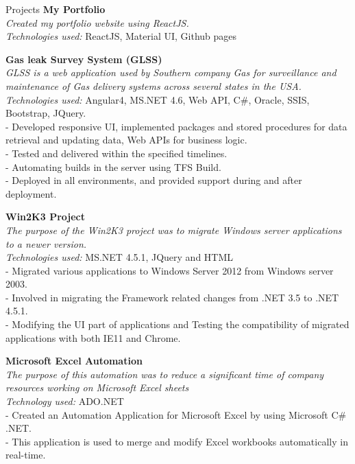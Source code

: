 \documentclass{resume} %
\begin{document}
\begin{rSection}{Projects}
{\bf My Portfolio}
\\{\textit{ Created my portfolio website using ReactJS.}}
\\{\textit{Technologies used:}} ReactJS, Material UI, Github pages

{\bf Gas leak Survey System (GLSS)}
\\{\textit{ GLSS is a web application used by Southern company Gas for surveillance and maintenance of Gas delivery systems across several states in the USA.}}
\\{\textit{Technologies used:}} Angular4, MS.NET 4.6, Web API, C\#, Oracle, SSIS, Bootstrap, JQuery.
\\- Developed responsive UI, implemented packages and stored procedures for data retrieval and updating data, Web APIs for business logic. 
\\- Tested and delivered within the specified timelines.
\\- Automating builds in the server using TFS Build.
\\- Deployed in all environments, and provided support during and after deployment. 

{\bf Win2K3 Project}
\\{\textit{The purpose of the Win2K3 project was to migrate Windows server applications to a newer version.}}
\\{\textit{Technologies used:}} MS.NET 4.5.1, JQuery and HTML
\\- Migrated various applications to Windows Server 2012 from Windows server 2003.
\\- Involved in migrating the Framework related changes from .NET 3.5 to .NET 4.5.1.
\\- Modifying the UI part of applications and Testing the compatibility of migrated applications with both IE11 and Chrome.

{\bf Microsoft Excel Automation}
\\{\textit{The purpose of this automation was to reduce a significant time of company resources working on Microsoft Excel sheets }}
\\{\textit{Technology used:}} ADO.NET
\\- Created an Automation Application for Microsoft Excel by using Microsoft C\# .NET.
\\- This application is used to merge and modify Excel workbooks automatically in real-time.
{\bf }


\end{rSection}
\end{document}
